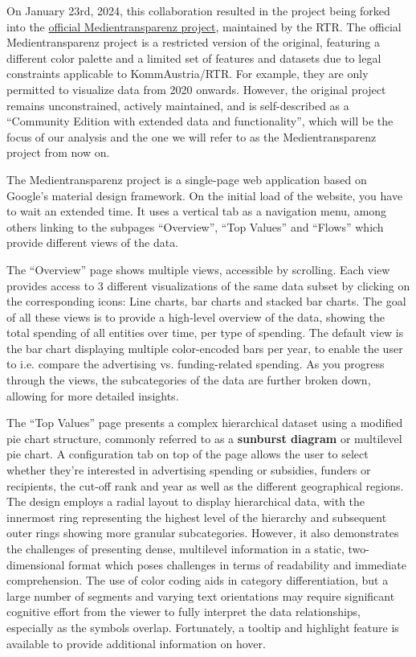 \documentclass{vgtc}
\begin{document}
On January 23rd, 2024, this collaboration resulted in the project being forked into the \href{https://visualisierung.medientransparenz.rtr.at/home}{official Medientransparenz project}, maintained by the RTR. The official Medientransparenz project is a restricted version of the original, featuring a different color palette and a limited set of features and datasets due to legal constraints applicable to KommAustria/RTR. For example, they are only permitted to visualize data from 2020 onwards. However, the original project remains unconstrained, actively maintained, and is self-described as a ``Community Edition with extended data and functionality'', which will be the focus of our analysis and the one we will refer to as the Medientransparenz project from now on.

The Medientransparenz project is a single-page web application based on Google's material design framework. On the initial load of the website, you have to wait an extended time. It uses a vertical tab as a navigation menu, among others linking to the subpages ``Overview'', ``Top Values'' and ``Flows'' which provide different views of the data.

The ``Overview'' page shows multiple views, accessible by scrolling. Each view provides access to 3 different visualizations of the same data subset by clicking on the corresponding icons: Line charts, bar charts and stacked bar charts. The goal of all these views is to provide a high-level overview of the data, showing the total spending of all entities over time, per type of spending. The default view is the bar chart displaying multiple color-encoded bars per year, to enable the user to i.e. compare the advertising vs. funding-related spending. As you progress through the views, the subcategories of the data are further broken down, allowing for more detailed insights. 

The ``Top Values'' page presents a complex hierarchical dataset using a modified pie chart structure, commonly referred to as a \textbf{sunburst diagram} or multilevel pie chart. A configuration tab on top of the page allows the user to select whether they're interested in advertising spending or subsidies, funders or recipients, the cut-off rank and year as well as the different geographical regions.
The design employs a radial layout to display hierarchical data, with the innermost ring representing the highest level of the hierarchy and subsequent outer rings showing more granular subcategories. However, it also demonstrates the challenges of presenting dense, multilevel information in a static, two-dimensional format which poses challenges in terms of readability and immediate comprehension. The use of color coding aids in category differentiation, but a large number of segments and varying text orientations may require significant cognitive effort from the viewer to fully interpret the data relationships, especially as the symbols overlap. Fortunately, a tooltip and highlight feature is available to provide additional information on hover.
\end{document}

